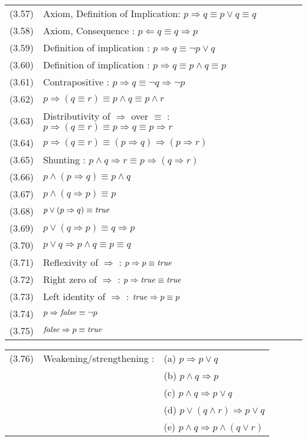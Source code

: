 \begin{tabular}{lll}
(3.57) & Axiom, Definition of Implication: $ p\Rightarrow q \equiv p\vee  q \equiv q $\\
(3.58) & Axiom, Consequence : $p\Leftarrow q \equiv q\Rightarrow
p$\\
(3.59) & Definition of implication : $ p\Rightarrow q \equiv
\neg p\vee  q $\\
(3.60) & Definition of implication : $
p\Rightarrow q \equiv p\wedge  q\equiv p $\\ (3.61) &
Contrapositive : $  p\Rightarrow q \equiv \neg q\Rightarrow  \neg
p $\\ (3.62) & $p\Rightarrow (q\equiv r) \equiv p\wedge q \equiv p
\wedge r$\\ (3.63) & Distributivity of $\Rightarrow$ over $\equiv$
: $p \Rightarrow (q\equiv r) \equiv p\Rightarrow q \equiv p
\Rightarrow r$\\ (3.64) &  $p \Rightarrow (q\equiv r) \equiv
(p\Rightarrow q) \Rightarrow (p \Rightarrow r)$\\ (3.65) &
Shunting : $p \wedge q\Rightarrow r \equiv p\Rightarrow (q
\Rightarrow r)$\\ (3.66) &  $p \wedge (p\Rightarrow q) \equiv p\wedge q$\\ (3.67) &  $p \wedge (q\Rightarrow p) \equiv p$\\ (3.68) &  $p \vee (p\Rightarrow q) \equiv \mbox{\textit{true}}$\\ (3.69) &  $p \vee (q\Rightarrow p) \equiv q\Rightarrow p$\\
(3.70) &  $p \vee q\Rightarrow p\wedge q \equiv p \equiv q$\\
(3.71) & Reflexivity of $\Rightarrow$ : $p\Rightarrow p \equiv \mbox{\textit{true}}$\\
(3.72) & Right zero of $\Rightarrow$ : $p \Rightarrow \mbox{\textit{true}} \equiv \mbox{\textit{true}}$\\
(3.73) & Left identity of $\Rightarrow$ : $\mbox{\textit{true}} \Rightarrow p \equiv p$\\
(3.74) & $p\Rightarrow \mbox{\textit{false}} \equiv \neg p$\\
(3.75) & $\mbox{\textit{false}} \Rightarrow p \equiv \mbox{\textit{true}}$\\
\end{tabular}

\begin{tabular}{lll}
(3.76) & Weakening/strengthening : & (a) $ p\Rightarrow p\vee q$\\
       & & (b) $ p\wedge q\Rightarrow p$\\
       & & (c) $ p\wedge q \Rightarrow p\vee q$\\
       & & (d) $ p\vee (q\wedge r) \Rightarrow p\vee q$\\
       & & (e) $ p\wedge q \Rightarrow p \wedge (q\vee r)$\\
\end{tabular}

